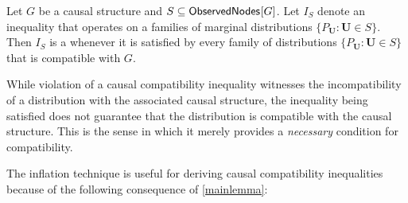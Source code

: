 \begin{definition}
Let $G$ be a causal structure and $S \subseteq {\operatorname{\mathsf{ObservedNodes}}_{}}\lbrack G\rbrack$.  Let $I_S$ denote an inequality that operates on a families of marginal distributions  $\{ P_{\bm{U}}: \bm{U} \in S\}$.  Then $I_S$ is a  whenever it is satisfied by every family of distributions $\{ P_{\bm{U}}: \bm{U} \in S\}$ that is compatible with $G$.
\end{definition}
While violation of a causal compatibility inequality witnesses the incompatibility of a distribution with the associated causal structure, the inequality being satisfied does not guarantee that the distribution is compatible with the causal structure.  This is the sense in which it merely provides a {\em necessary} condition for compatibility. 

The inflation technique is useful for deriving causal compatibility inequalities because of the following consequence of  \cref{mainlemma}:

